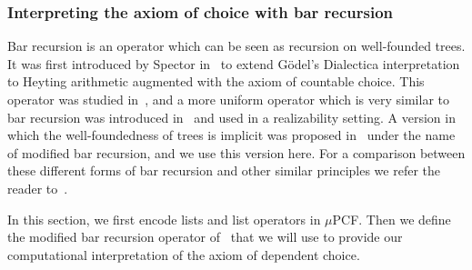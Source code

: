 \documentclass{CSML}
\begin{document}
\subsubsection{Interpreting the axiom of choice with bar recursion}
\label{barrecursion}
Bar recursion is an operator which can be seen as recursion on well-founded trees. It was first introduced by Spector in~\cite{Spector} to extend G\"odel's Dialectica interpretation to Heyting arithmetic augmented with the axiom of countable choice. This operator was studied in~\cite{KohlenbachThesis}, and a more uniform operator which is very similar to bar recursion was introduced in~\cite{BerardiBezemCoquand} and used in a realizability setting. A version in which the well-foundedness of trees is implicit was proposed in~\cite{BergerOlivaChoice} under the name of modified bar recursion, and we use this version here. For a comparison between these different forms of bar recursion and other similar principles we refer the reader to~\cite{PowellThesis,PowellEquivalence}.\par
In this section, we first encode lists and list operators in $\mu$PCF. Then we define the modified bar recursion operator of~\cite{BergerOlivaChoice} that we will use to provide our computational interpretation of the axiom of dependent choice.
\end{document}
